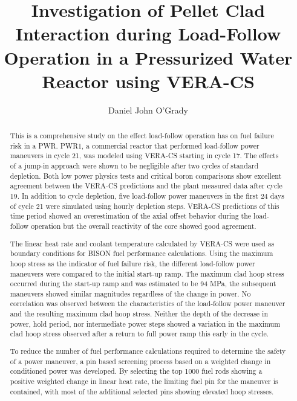 \documentclass[edeposit,fullpage,11pt]{uiucthesis2009}
\begin{document}
\title{Investigation of Pellet Clad Interaction during Load-Follow\\
       Operation in a Pressurized Water Reactor using VERA-CS}
\author{Daniel John O'Grady}
\msthesis
{}
\maketitle

\frontmatter

\begin{abstract}
This is a comprehensive study on the effect load-follow operation has on fuel failure risk in a PWR. 
PWR1, a commercial reactor that performed load-follow power maneuvers in cycle 21, was modeled using VERA-CS starting in cycle 17. 
The effects of a jump-in approach were shown to be negligible after two cycles of standard depletion.
Both low power physics tests and critical boron comparisons show excellent agreement between the VERA-CS predictions and the plant measured data after cycle 19.
In addition to cycle depletion, five load-follow power maneuvers in the first 24 days of cycle 21 were simulated using hourly depletion steps. 
VERA-CS predictions of this time period showed an overestimation of the axial offset behavior during the load-follow operation but the overall reactivity of the core showed good agreement.

The linear heat rate and coolant temperature calculated by VERA-CS were used as boundary conditions for BISON fuel performance calculations.
Using the maximum hoop stress as the indicator of fuel failure risk, the different load-follow power maneuvers were compared to the initial start-up ramp.
The maximum clad hoop stress occurred during the start-up ramp and was estimated to be 94 MPa, the subsequent maneuvers showed similar magnitudes regardless of the change in power. 
No correlation was observed between the characteristics of the load-follow power maneuver and the resulting maximum clad hoop stress. 
Neither the depth of the decrease in power, hold period, nor intermediate power steps showed a variation in the maximum clad hoop stress observed after a return to full power ramp this early in the cycle.

To reduce the number of fuel performance calculations required to determine the safety of a power maneuver, a pin based screening process based on a weighted change in conditioned power was developed.
By selecting the top 1000 fuel rods showing a positive weighted change in linear heat rate, the limiting fuel pin for the maneuver is contained, with most of the additional selected pins showing elevated hoop stresses. 
\end{abstract}
\end{document}
